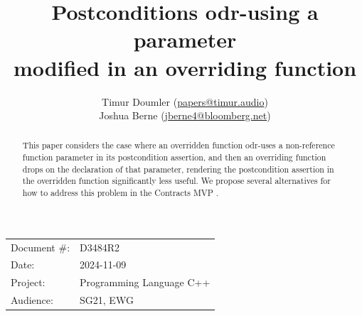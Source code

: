 

 \usepackage[bottom]{footmisc} 

 \usepackage{longtable}


\usepackage{tikz,lipsum,lmodern}
\usepackage[most]{tcolorbox}



\usepackage{titlesec}
\usepackage{tocloft}


\newcommand{\changelocaltocdepth}[1]{%
  \addtocontents{toc}{\protect\setcounter{tocdepth}{#1}}%
  \setcounter{tocdepth}{#1}%
}

\setcounter{tocdepth}{3}



\title{Postconditions odr-using a parameter \\ modified in an overriding function}
\author{
Timur Doumler \small(\href{mailto:papers@timur.audio}{papers@timur.audio}) \\
Joshua Berne \small(\href{mailto:jberne4@bloomberg.net}{jberne4@bloomberg.net}) \\
}
\date{}
\maketitle

\begin{tabular}{ll}
Document \#: & D3484R2 \\
Date: &2024-11-09 \\
Project: & Programming Language C++ \\
Audience: & SG21, EWG
\end{tabular}

\begin{abstract}
This paper considers the case where an overridden function odr-uses a non-reference function parameter in its postcondition assertion, and then an overriding function drops  on the declaration of that parameter, rendering the postcondition assertion in the overridden function significantly less useful. We propose several alternatives for how to address this problem in the Contracts MVP \cite{P2900R10}.
\end{abstract}


